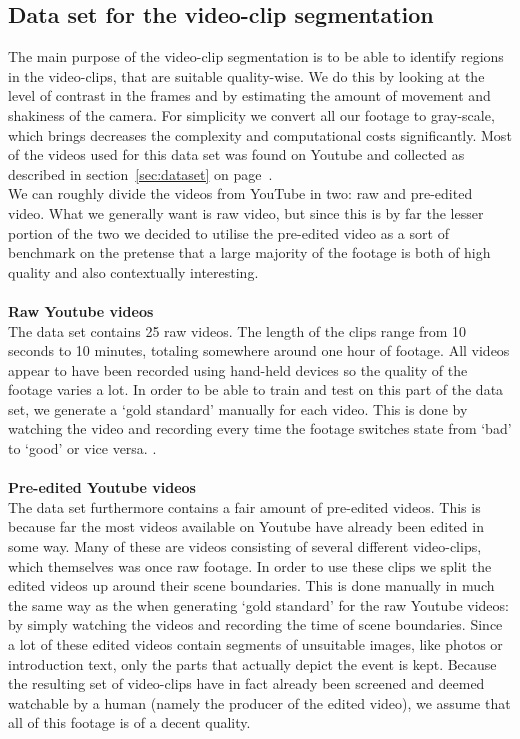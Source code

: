 \documentclass[12pt]{article}
\begin{document}
\subsection{Data set for the video-clip segmentation} \label{sec:videoclipsegmentationdataset}
%
The main purpose of the video-clip segmentation is to be able to identify regions in the video-clips, that are suitable quality-wise. We do this by looking at the level of contrast in the frames and by estimating the amount of movement and shakiness of the camera. For simplicity we convert all our footage to gray-scale, which brings decreases the complexity and computational costs significantly. Most of the videos used for this data set was found on Youtube and collected as described in section~\ref{sec:dataset} on page~\pageref{sec:dataset}.\\
We can roughly divide the videos from YouTube in two: raw and pre-edited video. What we generally want is raw video, but since this is by far the lesser portion of the two we decided to utilise the pre-edited video as a sort of benchmark on the pretense that a large majority of the footage is both of high quality and also contextually interesting.\\\\
%
\textbf{Raw Youtube videos}\\
The data set contains 25 raw videos. The length of the clips range from 10 seconds to 10 minutes, totaling somewhere around one hour of footage. All videos appear to have been recorded using hand-held devices so the quality of the footage varies a lot. In order to be able to train and test on this part of the data set, we generate a ‘gold standard’ manually for each video. This is done by watching the video and recording every time the footage switches state from ‘bad’ to ‘good’ or vice versa. %
.\\\\
%
\textbf{Pre-edited Youtube videos}\\
The data set furthermore contains a fair amount of pre-edited videos. This is because far the most videos available on Youtube have already been edited in some way. Many of these are videos consisting of several different video-clips, which themselves was once raw footage. In order to use these clips we split the edited videos up around their scene boundaries. This is done manually in much the same way as the when generating ‘gold standard’ for the raw Youtube videos: by simply watching the videos and recording the time of scene boundaries. Since a lot of these edited videos contain segments of unsuitable images, like photos or introduction text, only the parts that actually depict the event is kept. Because the resulting set of video-clips have in fact already been screened and deemed watchable by a human (namely the producer of the edited video), we assume that all of this footage is of a decent quality.\\\\
\end{document}
